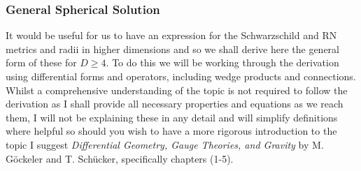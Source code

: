 \documentclass[12pt]{article}
\numberwithin{equation}{section}
\numberwithin{figure}{section}
\begin{document}
\subsubsection{General Spherical Solution} %
\label{sub:general_spherical_solution}
It would be useful for us to have an expression for the Schwarzschild and RN metrics and radii in higher dimensions and so we shall derive here the general form of these for $D\ge 4$. To do this we will be working through the derivation using differential forms and operators, including wedge products and connections. Whilst a comprehensive understanding of the topic is not required to follow the derivation as I shall provide all necessary properties and equations as we reach them, I will not be explaining these in any detail and will simplify definitions where helpful so should you wish to have a more rigorous introduction to the topic I suggest \emph{Differential Geometry, Gauge Theories, and Gravity} by M. G\"ockeler and T. Sch\"ucker\cite{ differential_geometry}, specifically chapters (1-5).
\end{document}
